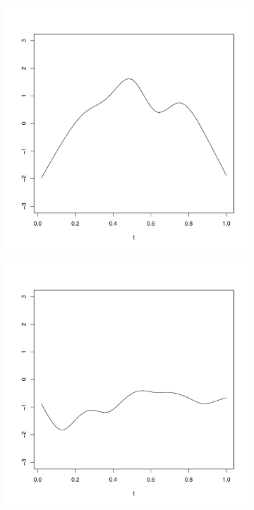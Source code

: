 \begin{figure}
	\begin{subfigure}
		[b]{0.32 
		\textwidth} \centering 
		\includegraphics[width=0.99 
		\textwidth]{Images-future-work/ef1.pdf} \caption{} \label{} 
	\end{subfigure}
	\begin{subfigure}
		[b]{0.32 
		\textwidth} \centering 
		\includegraphics[width=0.99 
		\textwidth]{Images-future-work/ef2.pdf} \caption{} \label{} 
	\end{subfigure}
	

\end{figure}
